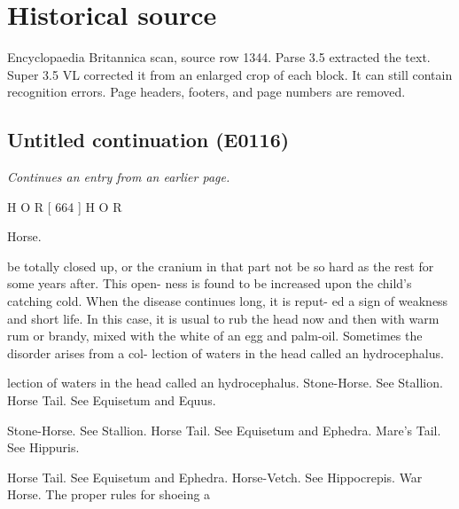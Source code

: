 \documentclass{article}
\begin{document}
\section*{Historical source}
Encyclopaedia Britannica scan, source row 1344. Parse 3.5 extracted the text. Super 3.5 VL corrected it from an enlarged crop of each block. It can still contain recognition errors.
Page headers, footers, and page numbers are removed.

\subsection*{Untitled continuation (E0116)}
\textit{Continues an entry from an earlier page.}

H O R [ 664 ] H O R

Horse.

be totally closed up, or the cranium in that part not be
so hard as the rest for some years after. This open-
ness is found to be increased upon the child's catching
cold. When the disease continues long, it is reput-
ed a sign of weakness and short life. In this case,
it is usual to rub the head now and then with warm
rum or brandy, mixed with the white of an egg and
palm-oil. Sometimes the disorder arises from a col-
lection of waters in the head called an hydrocephalus.

lection of waters in the head called an hydrocephalus.
Stone-Horse. See Stallion.
Horse Tail. See Equisetum and Equus.

Stone-Horse. See Stallion.
Horse Tail. See Equisetum and Ephedra.
Mare's Tail. See Hippuris.

Horse Tail. See Equisetum and Ephedra.
Horse-Vetch. See Hippocrepis.
War Horse. The proper rules for shoeing a
\end{document}
